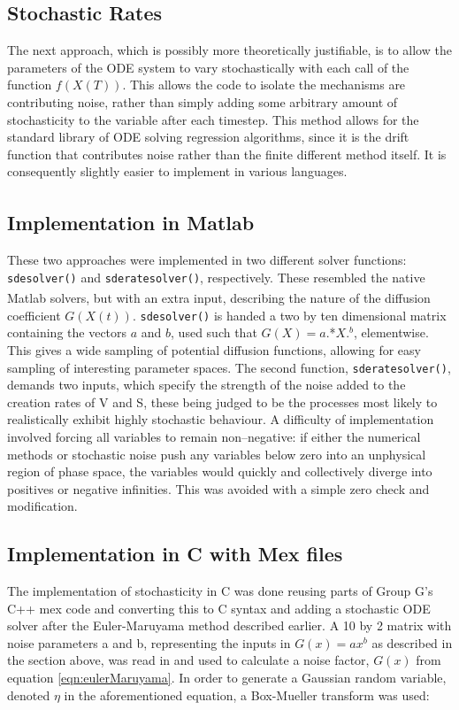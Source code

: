\documentclass[a4paper, 12pt]{report}
\begin{document}
\subsection{Stochastic Rates}

The next approach, which is possibly more theoretically justifiable, is to allow the parameters of the ODE system to vary stochastically with each call of the function $f(X(T))$. This allows the code to isolate the mechanisms are contributing noise, rather than simply adding some arbitrary amount of stochasticity to the variable after each timestep. This method allows for the standard library of ODE solving regression algorithms, since it is the drift function that contributes noise rather than the finite different method itself. It is consequently slightly easier to implement in various languages.

\subsection{Implementation in Matlab\textsuperscript{\textregistered}}

These two approaches were implemented in two different solver functions: \texttt{sdesolver()} and \texttt{sderatesolver()}, respectively. These resembled the native Matlab\textsuperscript{\textregistered} solvers, but with an extra input, describing the nature of the diffusion coefficient $G(X(t))$. \texttt{sdesolver()} is handed a two by ten dimensional matrix containing the vectors $a$ and $b$, used such that $G(X)=a.$*$X.^b$, elementwise. This gives a wide sampling of potential diffusion functions, allowing for easy sampling of interesting parameter spaces. The second function, \texttt{sderatesolver()}, demands two inputs, which specify the strength of the noise added to the creation rates of V and S, these being judged to be the processes most likely to realistically exhibit highly stochastic behaviour. A difficulty of implementation involved forcing all variables to remain non--negative: if either the numerical methods or stochastic noise push any variables below zero into an unphysical region of phase space, the variables would quickly and collectively diverge into positives or negative infinities. This was avoided with a simple zero check and modification.

\subsection{Implementation in C with Mex files} %
The implementation of stochasticity in C was done reusing parts of Group G's C++ mex code and converting this to C syntax and adding a stochastic ODE solver after the Euler-Maruyama method described earlier. A 10 by 2 matrix with noise parameters a and b, representing the inputs in $G(x) = ax^b$ as described in the section above, was read in and used to calculate a noise factor, $G(x)$ from equation \eqref{eqn:eulerMaruyama}. In order to generate a Gaussian random variable, denoted $\eta$ in the aforementioned equation, a Box-Mueller transform \cite{box1958} was used:
\end{document}
